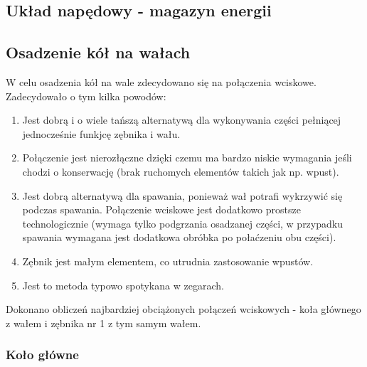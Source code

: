         \subsection{Układ napędowy - magazyn energii}
			
		\subsection{Osadzenie kół na wałach}

		W celu osadzenia kół na wale zdecydowano się na połączenia wciskowe. Zadecydowało o tym kilka powodów:
		\begin{enumerate}
			\item Jest dobrą i o wiele tańszą alternatywą dla wykonywania części pełniącej jednocześnie funkjcę zębnika i wału.
			\item Połączenie jest nierozłączne dzięki czemu ma bardzo niskie wymagania jeśli chodzi o konserwację (brak ruchomych elementów takich jak np. wpust). 
			\item Jest dobrą alternatywą dla spawania, ponieważ wał potrafi wykrzywić się podczas spawania. Połączenie wciskowe jest dodatkowo prostsze technologicznie (wymaga tylko podgrzania osadzanej części, w przypadku spawania wymagana jest dodatkowa obróbka po połaćzeniu obu części).
			\item Zębnik jest małym elementem, co utrudnia zastosowanie wpustów.
			\item Jest to metoda typowo spotykana w zegarach.
		\end{enumerate}
		Dokonano obliczeń najbardziej obciążonych połączeń wciskowych - koła głównego z wałem i zębnika nr 1 z tym samym wałem.

		\subsubsection{Koło główne}
